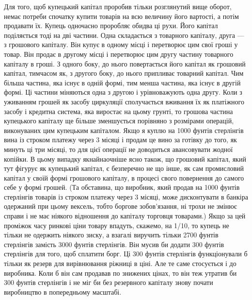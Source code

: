 Для того, щоб купецький капітал проробив тільки розглянутий
вище оборот, немає потреби спочатку купити товарів на
всю величину його вартості, а потім продавати їх. Купець одночасно
проробляє обидва ці рухи. Його капітал поділяється тоді
на дві частини. Одна складається з товарного капіталу, друга —
з грошового капіталу. Він купує в одному місці і перетворює
цим свої гроші у товар. Він продає в другому місці і перетворює
цим другу частину товарного капіталу в гроші. З одного
боку, до нього повертається його капітал як грошовий капітал,
тимчасом як, з другого боку, до нього припливає товарний капітал.
Чим більша частина, яка існує в одній формі, тим менша
частина, яка існує в другій формі. Ці частини міняються одна
з другою і урівноважують одна другу. Коли з уживанням грошей
як засобу циркуляції сполучається вживання їх як платіжного
засобу і кредитна система, яка виростає на цьому грунті, то
грошова частина купецького капіталу ще більше зменшується порівняно
з розмірами операцій, виконуваних цим купецьким капіталом.
Якщо я куплю на 1000 фунтів стерлінгів вина із строком
платежу через 3 місяці і продам це вино за готівку до того, як
минуть ці три місяці, то для цієї операції не доводиться авансовувати
жодної копійки. В цьому випадку якнайнаочніше ясно
також, що грошовий капітал, який тут фігурує як купецький
капітал, є безперечно не що інше, як сам промисловий капітал
у своїй формі грошового капіталу, в процесі свого повернення
до самого себе у формі грошей. (Та обставина, що виробник,
який продав на 1000 фунтів стерлінгів товарів із строком платежу
через 3 місяці, може дисконтувати в банкіра одержаний при цьому
вексель, тобто боргове зобов’язання, ні трохи не змінює справи
і не має ніякого відношення до капіталу торговця товарами.)
Якщо за цей проміжок часу ринкові ціни товару впадуть,
скажемо, на 1/10, то купець не тільки не одержить ніякого
зиску, а взагалі виручить тільки 2700 фунтів стерлінгів замість
3000 фунтів стерлінгів. Він мусив би додати 300 фунтів стерлінгів
для того, щоб сплатити борг. Ці 300 фунтів стерлінгів
функціонували б тільки як резерв для вирівнювання ріжниці в
ціні. Але те саме стосується і до виробника. Коли б він сам продавав
по знижених цінах, то він теж утратив би 300 фунтів стерлінгів
і не міг би без резервного капіталу знову почати виробництво
в попередньому масштабі.


